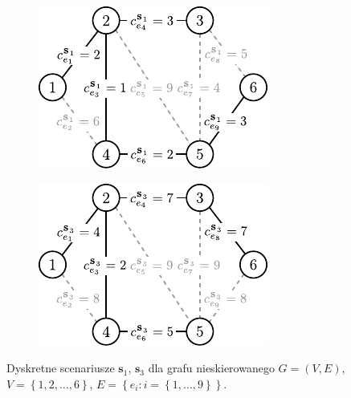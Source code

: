 \begin{figure}[!htbp]
	\null\hfill
	\begin{subfigure}[b]{0.35\textwidth}
		\includegraphics[width=\textwidth]{Chapter_II/MIN-MAX-DESC-example/a}
		\caption{}
		\label{fig:minmaxdesc:a}
	\end{subfigure}
	\hfill
	\begin{subfigure}[b]{0.35\textwidth}
		\includegraphics[width=\textwidth]{Chapter_II/MIN-MAX-DESC-example/b}
		\caption{}
		\label{fig:minmaxdesc:b}
	\end{subfigure}
	\hfill\null
	\caption{
		Dyskretne scenariusze $\textbf{s}_{1}$, $\textbf{s}_{3}$ dla grafu nieskierowanego $G = \left( V, E \right)$, $V = \left\{ 1, 2, \dots, 6 \right\}$, $E = \left\{ e_{i} : i = \left\{ 1, \dots, 9 \right\} \right\}$.
	}
	\label{fig:minmaxdesc}
\end{figure}

